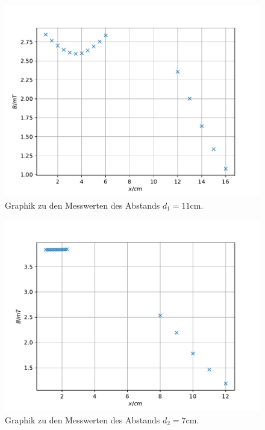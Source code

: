 \begin{figure}
\centering
\includegraphics{content/data/plot_helmholtz1.pdf}
\caption{Graphik zu den Messwerten des Abstands $d_1=11\si{\centi\metre}$. }
\label{fig:helm1}
\end{figure}

\begin{figure}
\centering
\includegraphics{content/data/plot_helmholtz2.pdf}
\caption{Graphik zu den Messwerten des Abstands  $d_2=7\si{\centi\metre}$.}
\label{fig:helm2}
\end{figure}

